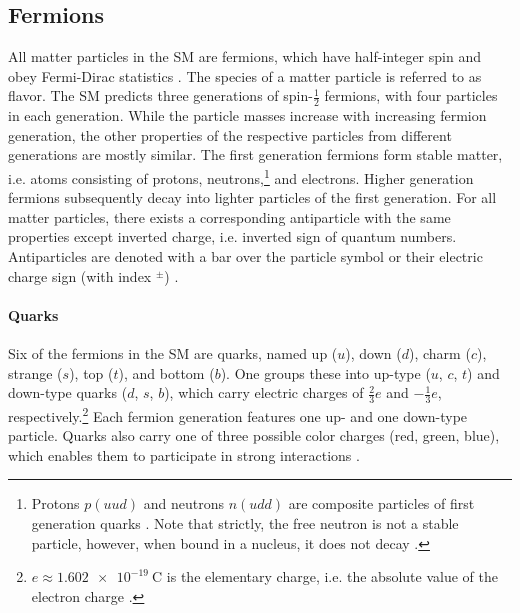 \subsection{Fermions}
All matter particles in the \ac{SM} are fermions, which have half-integer spin and obey Fermi-Dirac statistics \cite{FermiDirac-Dirac,FermiDirac-Fermi}. The species of a matter particle is referred to as flavor. The \ac{SM} predicts three generations of spin-$\frac{1}{2}$ fermions, with four particles in each generation. While the particle masses increase with increasing fermion generation, the other properties of the respective particles from different generations are mostly similar. The first generation fermions form stable matter, i.e. atoms consisting of protons, neutrons,\footnote{Protons $p(uud)$ and neutrons $n(udd)$ are composite particles of first generation quarks \cite{Book-Thomson}. Note that strictly, the free neutron is not a stable particle, however, when bound in a nucleus, it does not decay \cite{PDG2024}.} and electrons. Higher generation fermions subsequently decay into lighter particles of the first generation. For all matter particles, there exists a corresponding antiparticle with the same properties except inverted charge, i.e. inverted sign of quantum numbers. Antiparticles are denoted with a bar over the particle symbol or their electric charge sign (with index $^\pm$) \cite{Book-Thomson,SM-Gaillard,Book-Griffiths}.
\paragraph{Quarks} Six of the fermions in the \ac{SM} are quarks, named up ($u$), down ($d$), charm ($c$), strange ($s$), top ($t$), and bottom ($b$). One groups these into up-type ($u$, $c$, $t$) and down-type quarks ($d$, $s$, $b$), which carry electric charges of $\frac{2}{3}e$ and $-\frac{1}{3}e$, respectively.\footnote{$e\approx\SI{1.602e-19}{\coulomb}$ is the elementary charge, i.e. the absolute value of the electron charge \cite{PDG2024}.} Each fermion generation features one up- and one down-type particle. Quarks also carry one of three possible color charges (red, green, blue), which enables them to participate in strong interactions \cite{Book-Thomson,Book-Griffiths}.

